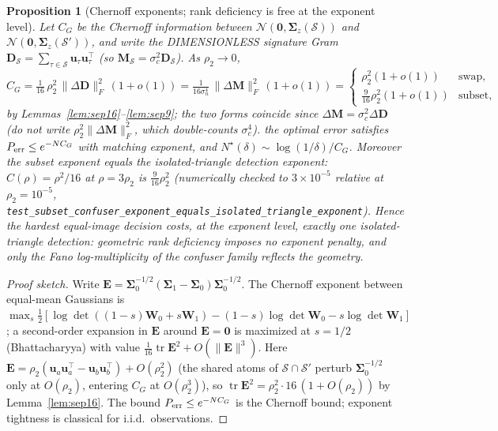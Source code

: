 \documentclass[11pt]{article}
\newtheorem{proposition}[theorem]{Proposition}
\newcommand{\Scal}{\mathcal{S}}
\begin{document}
\begin{proposition}[Chernoff exponents; rank deficiency is free at the
exponent level]\label{prop:cg}
Let $C_G$ be the Chernoff information between
$\mathcal N(\bm 0,\bm\Sigma_z(\Scal))$ and
$\mathcal N(\bm 0,\bm\Sigma_z(\Scal'))$, and write the DIMENSIONLESS
signature Gram $\bm D_\Scal=\sum_{\tau\in\Scal}\bm u_\tau\bm u_\tau^{\!\top}$
(so $\bm M_\Scal=\sigma_c^2\bm D_\Scal$). As $\rho_2\to0$,
\[
C_G=\tfrac{1}{16}\,\rho_2^2\,\|\Delta\bm D\|_F^2\,(1+o(1))
=\tfrac{1}{16\sigma_n^4}\,\|\Delta\bm M\|_F^2\,(1+o(1))
=\begin{cases}
\rho_2^2(1+o(1)) & \text{swap},\\[2pt]
\tfrac9{16}\rho_2^2(1+o(1)) & \text{subset},
\end{cases}
\]
by Lemmas~\ref{lem:sep16}--\ref{lem:sep9}; the two forms coincide since
$\Delta\bm M=\sigma_c^2\Delta\bm D$ (do \emph{not} write
$\rho_2^2\|\Delta\bm M\|_F^2$, which double-counts $\sigma_c^4$).
the optimal error satisfies $P_{\rm err}\le e^{-N C_G}$ with matching
exponent, and $N^\star(\delta)\sim\log(1/\delta)/C_G$. Moreover the
subset exponent \emph{equals} the isolated-triangle detection exponent:
$C(\rho)=\rho^2/16$ at $\rho=3\rho_2$ is $\tfrac9{16}\rho_2^2$
(numerically checked to $3\times10^{-5}$ relative at $\rho_2=10^{-5}$,
{\sloppy\texttt{test\_subset\_confuser\_}\allowbreak\texttt{exponent\_equals\_}\allowbreak\texttt{isolated\_}\allowbreak\texttt{triangle\_exponent}}).
Hence the hardest equal-image decision costs, at the exponent level, exactly
one isolated-triangle detection: geometric rank deficiency imposes no
exponent penalty, and only the Fano log-multiplicity of the confuser family
reflects the geometry.
\end{proposition}
\begin{proof}[Proof sketch]
Write $\bm E=\bm\Sigma_0^{-1/2}(\bm\Sigma_1-\bm\Sigma_0)\bm\Sigma_0^{-1/2}$.
The Chernoff exponent between equal-mean Gaussians is
$\max_s\frac12[\log\det((1-s)\bm W_0+s\bm W_1)-(1-s)\log\det\bm W_0
-s\log\det\bm W_1]$; a second-order expansion in $\bm E$ around $\bm E=\bm 0$
is maximized at $s=1/2$ (Bhattacharyya) with value
$\tfrac1{16}\operatorname{tr}\bm E^2+O(\|\bm E\|^3)$. Here
$\bm E=\rho_2(\bm u_a\bm u_a^{\!\top}-\bm u_b\bm u_b^{\!\top})+O(\rho_2^2)$
(the shared atoms of $\Scal\cap\Scal'$ perturb $\bm\Sigma_0^{-1/2}$ only at
$O(\rho_2)$, entering $C_G$ at $O(\rho_2^3)$), so
$\operatorname{tr}\bm E^2=\rho_2^2\cdot16\,(1+O(\rho_2))$ by
Lemma~\ref{lem:sep16}. The bound $P_{\rm err}\le e^{-NC_G}$ is the Chernoff
bound; exponent tightness is classical for i.i.d.\ observations.
\end{proof}
\end{document}
